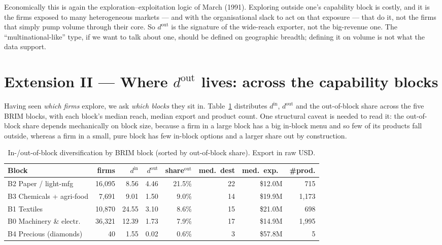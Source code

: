 \documentclass[11pt]{article}
\newcommand{\din}{d^{\mathrm{in}}}
\newcommand{\dout}{d^{\mathrm{out}}}
\begin{document}
Economically this is again the exploration--exploitation logic of March (1991). Exploring outside one's
capability block is costly, and it is the firms exposed to many heterogeneous markets --- and with the
organisational slack to act on that exposure --- that do it, not the firms that simply pump volume through their
core. So $\dout$ is the signature of the wide-reach exporter, not the big-revenue one. The ``multinational-like''
type, if we want to talk about one, should be defined on geographic breadth; defining it on volume is not what
the data support.

\section{Extension II --- Where $\dout$ lives: across the capability blocks}
\label{sec:blocks}

Having seen \emph{which firms} explore, we ask \emph{which blocks} they sit in. Table~\ref{tab:blockdiv}
distributes $\din$, $\dout$ and the out-of-block share across the five BRIM blocks, with each block's median
reach, median export and product count. One structural caveat is needed to read it: the out-of-block share
depends mechanically on block size, because a firm in a large block has a big in-block menu and so few of its
products fall outside, whereas a firm in a small, pure block has few in-block options and a larger share out by
construction.

\begin{table}[H]\centering\footnotesize
\caption{In-/out-of-block diversification by BRIM block (sorted by out-of-block share). Export in raw USD.}
\label{tab:blockdiv}
\setlength{\tabcolsep}{5pt}
\begin{tabular}{@{}lrrrrrrr@{}}
\toprule
Block & firms & $\din$ & $\dout$ & share$^{\mathrm{out}}$ & med.\ dest & med.\ exp.\ & \#prod. \\
\midrule
B2 Paper / light-mfg     & 16{,}095 &  8.56 & 4.46 & 21.5\% & 22 & \$12.0M & 715 \\
B3 Chemicals + agri-food &  7{,}691 &  9.01 & 1.50 &  9.0\% & 14 & \$19.9M & 1{,}173 \\
B1 Textiles              & 10{,}870 & 24.55 & 3.10 &  8.6\% & 15 & \$21.0M & 698 \\
B0 Machinery \& electr.  & 36{,}321 & 12.39 & 1.73 &  7.9\% & 17 & \$14.9M & 1{,}995 \\
B4 Precious (diamonds)   &      40  &  1.55 & 0.02 &  0.6\% &  3 & \$57.8M & 5 \\
\bottomrule
\end{tabular}
\end{table}
\end{document}
